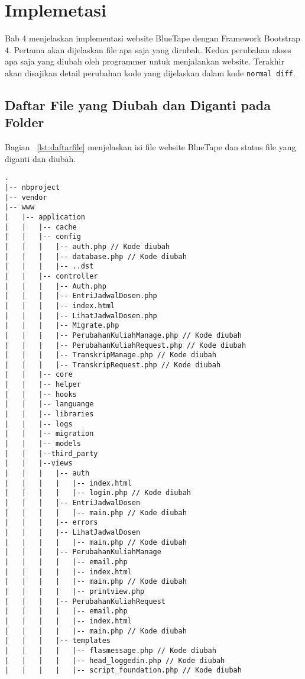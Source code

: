 \chapter{Implemetasi}
Bab 4 menjelaskan implementasi website BlueTape dengan Framework Bootstrap 4. Pertama akan dijelaskan file apa saja yang dirubah. Kedua perubahan akses apa saja yang diubah oleh programmer untuk menjalankan website. Terakhir akan disajikan detail perubahan kode yang dijelaskan dalam kode \texttt{normal diff}.

\section{Daftar File yang Diubah dan Diganti pada Folder}
Bagian ~\ref{lst:daftarfile} menjelaskan isi file website BlueTape dan status file yang diganti dan diubah.
\begin{lstlisting}[basicstyle=\ttfamily, frame=single, caption=Perubahan isi folder BlueTape,
columns=fullflexible, keepspaces=true, breaklines=true, label={lst:daftarfile}]
.
|-- nbproject
|-- vendor
|-- www
|   |-- application
|   |   |-- cache
|   |   |-- config
|   |   |   |-- auth.php // Kode diubah
|   |   |   |-- database.php // Kode diubah
|   |   |   |-- ..dst
|   |   |-- controller
|   |   |   |-- Auth.php
|   |   |   |-- EntriJadwalDosen.php
|   |   |   |-- index.html
|   |   |   |-- LihatJadwalDosen.php
|   |   |   |-- Migrate.php
|   |   |   |-- PerubahanKuliahManage.php // Kode diubah
|   |   |   |-- PerubahanKuliahRequest.php // Kode diubah
|   |   |   |-- TranskripManage.php // Kode diubah
|   |   |   |-- TranskripRequest.php // Kode diubah
|   |   |-- core
|   |   |-- helper
|   |   |-- hooks
|   |   |-- languange
|   |   |-- libraries
|   |   |-- logs
|   |   |-- migration
|   |   |-- models
|   |   |--third_party
|   |   |--views
|   |   |   |-- auth
|   |   |   |   |-- index.html
|   |   |   |   |-- login.php // Kode diubah
|   |   |   |-- EntriJadwalDosen
|   |   |   |   |-- main.php // Kode diubah
|   |   |   |-- errors
|   |   |   |-- LihatJadwalDosen
|   |   |   |   |-- main.php // Kode diubah
|   |   |   |-- PerubahanKuliahManage
|   |   |   |   |-- email.php
|   |   |   |   |-- index.html
|   |   |   |   |-- main.php // Kode diubah
|   |   |   |   |-- printview.php
|   |   |   |-- PerubahanKuliahRequest
|   |   |   |   |-- email.php
|   |   |   |   |-- index.html
|   |   |   |   |-- main.php // Kode diubah
|   |   |   |-- templates
|   |   |   |   |-- flasmessage.php // Kode diubah
|   |   |   |   |-- head_loggedin.php // Kode diubah
|   |   |   |   |-- script_foundation.php // Kode diubah

\end{lstlisting}

